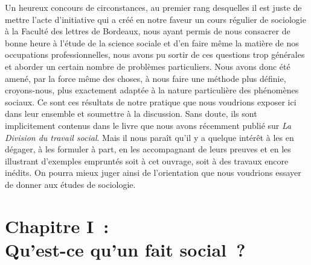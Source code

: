 \documentclass[french,twoside]{book} %
\newcommand\chapteropen{} %
\begin{document}
Un heureux concours de circonstances, au premier rang desquelles il est juste de mettre l’acte d’initiative qui a créé en notre faveur un cours régulier de sociologie à la Faculté des lettres de Bordeaux, nous ayant permis de nous consacrer de bonne heure à l’étude de la science sociale et d’en faire même la matière de nos occupations professionnelles, nous avons pu sortir de ces questions trop générales et aborder un certain nombre de problèmes particuliers. Nous avons donc été amené, par la force même des choses, à nous faire une méthode plus définie, croyons-nous, plus exactement adaptée à la nature particulière des phénomènes sociaux. Ce sont ces résultats de notre pratique que nous voudrions exposer ici dans leur ensemble et soumettre à la discussion. Sans doute, ils sont implicitement contenus dans le livre que nous avons récemment publié sur \emph{La Division du travail social}. Mais il nous paraît qu’il y a quelque intérêt à les en dégager, à les formuler à part, en les accompagnant de leurs preuves et en les illustrant d’exemples empruntés soit à cet ouvrage, soit à des travaux encore inédits. On pourra mieux juger ainsi de l’orientation que nous voudrions essayer de donner aux études de sociologie.

\chapteropen
\chapter[{Chapitre I : Qu’est-ce qu’un fait social ?}]{Chapitre I : \\
Qu’est-ce qu’un fait social ?}\renewcommand{\leftmark}{Chapitre I : \\
Qu’est-ce qu’un fait social ?}
\end{document}
